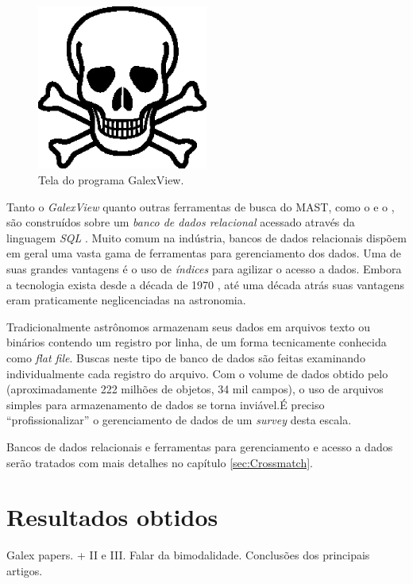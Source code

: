 \begin{figure}
	\includegraphics[width=0.5\textwidth]{figuras/test.eps}
	\caption[Tela do programa GalexView.]
	{Tela do programa GalexView.}
	\label{fig:GalexView}
\end{figure}

Tanto o {\em GalexView} quanto outras ferramentas de busca do MAST, como o
 e o , são construídos sobre um
{\em banco de dados relacional} acessado através da linguagem {\em SQL}
\citep{Chamberlin1974}. Muito comum na indústria, bancos de dados relacionais
dispõem em geral uma vasta gama de ferramentas para gerenciamento dos dados. Uma
de suas grandes vantagens é o uso de {\em índices} para agilizar o acesso a
dados. Embora a tecnologia exista desde a década de 1970 \citep{Codd1970}, até
uma década atrás suas vantagens eram praticamente neglicenciadas na astronomia.

Tradicionalmente astrônomos armazenam seus dados em arquivos texto ou binários
contendo um registro por linha, de um forma tecnicamente conhecida como {\em
flat file}. Buscas neste tipo de banco de dados são feitas examinando
individualmente cada registro do arquivo. Com o volume de dados obtido pelo
\galex (aproximadamente 222 milhões de objetos, 34 mil campos)\citneed, o uso
de arquivos simples para armazenamento de dados se torna inviável.\citneed É
preciso ``profissionalizar'' o gerenciamento de dados de um {\em survey} desta
escala.

Bancos de dados relacionais e ferramentas para gerenciamento e acesso a dados
serão tratados com mais detalhes no capítulo \ref{sec:Crossmatch}.



\section{Resultados obtidos}
\label{sec:Galex:Resultados}


Galex papers. \cite{Wyder2007} + II e III.
Falar da bimodalidade. Conclusões dos principais artigos.




